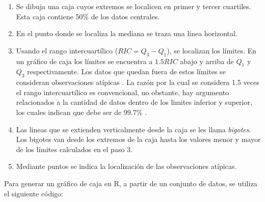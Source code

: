 \documentclass[
]{book}
\providecommand{\tightlist}{%
  \setlength{\itemsep}{0pt}\setlength{\parskip}{0pt}}
\begin{document}
\begin{enumerate}
\def\labelenumi{\arabic{enumi}.}
\tightlist
\item
  Se dibuja una caja cuyos extremos se localicen en primer y tercer cuartiles. Esta caja contiene 50\% de los datos centrales.
\item
  En el punto donde se localiza la mediana se traza una linea horizontal.
\item
  Usando el rango intercuartílico (\(RIC = Q_3-Q_1\)), se localizan los límites. En un gráfico de caja los límites se encuentra a \(1.5RIC\) abajo y arriba de \(Q_1\) y \(Q_3\) respectivamente. Los datos que quedan fuera de estos límites se consideran observaciones atípicas \citep{Tukey}. La razón por la cual se considera 1.5 veces el rango intercuartílico es convencional, no obstante, hay argumento relacionados a la cantidad de datos dentro de los limites inferior y superior, los cuales indican que debe ser de 99.7\% \citep{James2013}.
\item
  Las lineas que se extienden verticalmente desde la caja se les llama \emph{bigotes}. Los bigotes van desde los extremos de la caja hasta los valores menor y mayor de los límites calculados en el paso 3.
\item
  Mediante puntos se indica la localización de las observaciones atípicas.
\end{enumerate}

Para generar un gráfico de caja en R, a partir de un conjunto de datos, se utiliza el siguiente código:
\end{document}
